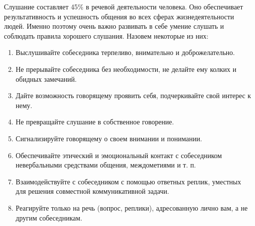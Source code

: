 Слушание составляет 45\% в речевой деятельности человека. 
Оно обеспечивает результативность и успешность общения во всех сферах жизнедеятельности людей. 
Именно поэтому очень важно развивать в себе умение слушать и соблюдать правила хорошего слушания. Назовем некоторые из них:
\begin{enumerate}
	\item Выслушивайте собеседника терпеливо, внимательно и доброжелательно.
	\item Не прерывайте собеседника без необходимости, не делайте ему колких и обидных замечаний.
	\item Дайте возможность говорящему проявить себя, подчеркивайте свой интерес к нему.
	\item Не превращайте слушание в собственное говорение.
	\item Сигнализируйте говорящему о своем внимании и понимании.
	\item Обеспечивайте этический и эмоциональный контакт с собеседником невербальными средствами общения, междометиями и т. п.
	\item Взаимодействуйте с собеседником с помощью ответных реплик, уместных для решения совместной коммуникативной задачи.
	\item Реагируйте только на речь (вопрос, реплики), адресованную лично вам, а не другим собеседникам.
\end{enumerate}